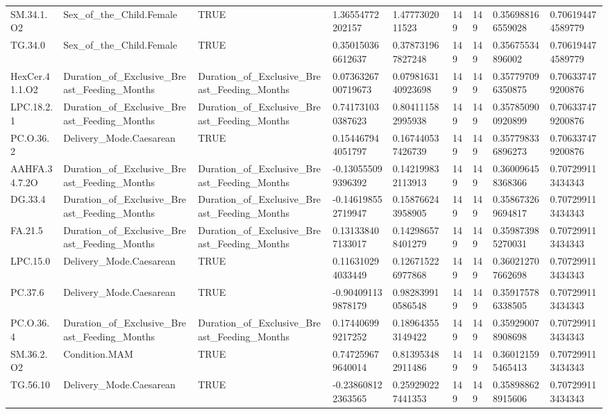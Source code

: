 \begin{longtable}{lllllllll}
SM.34.1.O2 & Sex\_of\_the\_Child.Female & TRUE & 1.36554772202157 & 1.4777302011523 & 149 & 149 & 0.356988166559028 & 0.706194474589779 \\
TG.34.0 & Sex\_of\_the\_Child.Female & TRUE & 0.350150366612637 & 0.378731967827248 & 149 & 149 & 0.35675534896002 & 0.706194474589779 \\
HexCer.41.1.O2 & Duration\_of\_Exclusive\_Breast\_Feeding\_Months & Duration\_of\_Exclusive\_Breast\_Feeding\_Months & 0.0736326700719673 & 0.0798163140923698 & 149 & 149 & 0.357797096350875 & 0.706337479200876 \\
LPC.18.2.1 & Duration\_of\_Exclusive\_Breast\_Feeding\_Months & Duration\_of\_Exclusive\_Breast\_Feeding\_Months & 0.741731030387623 & 0.804111582995938 & 149 & 149 & 0.357850900920899 & 0.706337479200876 \\
PC.O.36.2 & Delivery\_Mode.Caesarean & TRUE & 0.154467944051797 & 0.167440537426739 & 149 & 149 & 0.357798336896273 & 0.706337479200876 \\
AAHFA.34.7.2O & Duration\_of\_Exclusive\_Breast\_Feeding\_Months & Duration\_of\_Exclusive\_Breast\_Feeding\_Months & -0.130555099396392 & 0.142199832113913 & 149 & 149 & 0.360096458368366 & 0.707299113434343 \\
DG.33.4 & Duration\_of\_Exclusive\_Breast\_Feeding\_Months & Duration\_of\_Exclusive\_Breast\_Feeding\_Months & -0.146198552719947 & 0.158766243958905 & 149 & 149 & 0.358673269694817 & 0.707299113434343 \\
FA.21.5 & Duration\_of\_Exclusive\_Breast\_Feeding\_Months & Duration\_of\_Exclusive\_Breast\_Feeding\_Months & 0.131338407133017 & 0.142986578401279 & 149 & 149 & 0.359873985270031 & 0.707299113434343 \\
LPC.15.0 & Delivery\_Mode.Caesarean & TRUE & 0.116310294033449 & 0.126715226977868 & 149 & 149 & 0.360212707662698 & 0.707299113434343 \\
PC.37.6 & Delivery\_Mode.Caesarean & TRUE & -0.904091139878179 & 0.982839910586548 & 149 & 149 & 0.359175786338505 & 0.707299113434343 \\
PC.O.36.4 & Duration\_of\_Exclusive\_Breast\_Feeding\_Months & Duration\_of\_Exclusive\_Breast\_Feeding\_Months & 0.174406999217252 & 0.189643553149422 & 149 & 149 & 0.359290078908698 & 0.707299113434343 \\
SM.36.2.O2 & Condition.MAM & TRUE & 0.747259679640014 & 0.813953482911486 & 149 & 149 & 0.360121595465413 & 0.707299113434343 \\
TG.56.10 & Delivery\_Mode.Caesarean & TRUE & -0.238608122363565 & 0.259290227441353 & 149 & 149 & 0.358988628915606 & 0.707299113434343 \\

\end{longtable}
